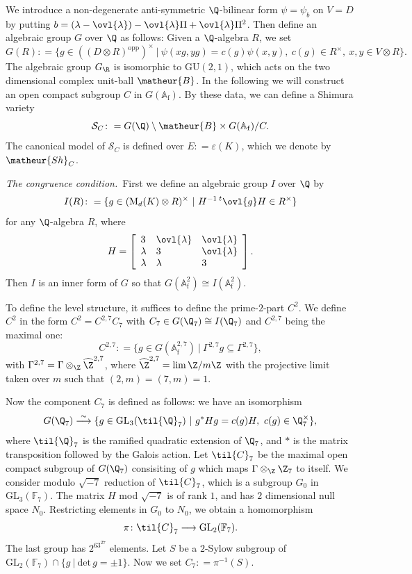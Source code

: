 We introduce a non-degenerate anti-symmetric $\Q$-bilinear
form $\psi=\psi_b$ on $V=D$ by putting 
$b=(\lambda-\ovl{\lambda})-\ovl{\lambda}\Pi+\ovl{\lambda}\Pi^2$.
Then define an algebraic group $G$ over $\Q$ as follows: 
Given a $\Q$-algebra $R$, we set
$$
G(R)\colon=\{g\in((D\otimes R)^{\mathrm{opp}})^{\times}\ |\ \psi(xg,yg)=
c(g)\psi(x,y),\ c(g)\in R^{\times},\ x,y\in V\otimes R\}.
$$
The algebraic group $G_{\R}$ is isomorphic to $\mathrm{GU}(2,1)$, which 
acts on the two dimensional complex unit-ball $\matheur{B}$.
In the following we will construct an open compact subgroup $C$ in
$G(\mathbb{A}_{\mathrm{f}})$.
By these data, we can define a Shimura variety
$$
\mathcal{S}_C\colon=G(\Q)\setminus\matheur{B}\times 
G(\mathbb{A}_{\mathrm{f}})/C.
$$
The canonical model of $\mathcal{S}_C$ is defined over $E\colon=
\varepsilon(K)$, which we denote by $\matheur{Sh}_C$.

\vspace{1ex}
{\it The congruence condition.}\ 
First we define an algebraic group $I$ over $\Q$ by 
$$
I(R)\colon=\{g\in(\mathrm{M}_d(K)\otimes R)^{\times}\ |\
H^{-1}\,^t\ovl{g}H\in R^{\times}\}
$$
for any $\Q$-algebra $R$, where 
$$
H=\left[
\begin{array}{lll}
3&\ovl{\lambda}&\ovl{\lambda}\\
\lambda&3&\ovl{\lambda}\\
\lambda&\lambda&3
\end{array}
\right].
$$
Then $I$ is an inner form of $G$ so that 
$G(\mathbb{A}^2_{\mathrm{f}})\cong I(\mathbb{A}^2_{\mathrm{f}})$.

To define the level structure, it suffices to define the 
prime-$2$-part $C^2$.
We define
$C^2$ in the form $C^2=C^{2,7}C_7$ with $C_7\in G(\Q_7)\cong I(\Q_7)$
and $C^{2,7}$ being the maximal one:
$$
C^{2,7}\colon=\{g\in G(\mathbb{A}^{2,7}_{\mathrm{f}})\ |\ \Gamma^{2,7}g
\subseteq\Gamma^{2,7}\},
$$
with $\Gamma^{2,7}=\Gamma\otimes_{\Z}\widehat{\Z}^{2,7}$, where
$\widehat{\Z}^{2,7}=\lim\Z/m\Z$ with the projective limit taken over $m$ 
such that $(2,m)=(7,m)=1$.

Now the component $C_7$ is defined as follows:
we have an isomorphism
$$
G(\Q_7)\stackrel{\sim}{\longrightarrow}\{g\in\mathrm{GL}_3(\til{\Q}_7)
\ |\ g^{\ast}Hg=c(g)H,\ c(g)\in\Q^{\times}_7\},
$$
where $\til{\Q}_7$ is the ramified quadratic extension of $\Q_7$, and
$\ast$ is the matrix transposition followed by the Galois action.
Let $\til{C}_7$ be the maximal open compact subgroup of $G(\Q_7)$ 
consisiting of $g$ which maps $\Gamma\otimes_{\Z}\Z_7$ to itself.
We consider modulo $\sqrt{-7}$ reduction of $\til{C}_7$, which is a
subgroup $G_0$ in $\mathrm{GL}_3(\mathbb{F}_7)$.
The matrix $H$ mod $\sqrt{-7}$ is of rank $1$, and has $2$ dimensional
null space $N_0$.
Restricting elements in $G_0$ to $N_0$, we obtain a homomorphism
$$
\pi\colon\til{C}_7\longrightarrow\mathrm{GL}_2(\mathbb{F}_7).
$$
The last group has $2^63^27$ elements. Let $S$ be a $2$-Sylow subgroup
of $\mathrm{GL}_2(\mathbb{F}_7)\cap\{g\ |\ \mathrm{det}\,g=\pm 1\}$.
Now we set $C_7\colon=\pi^{-1}(S)$.

